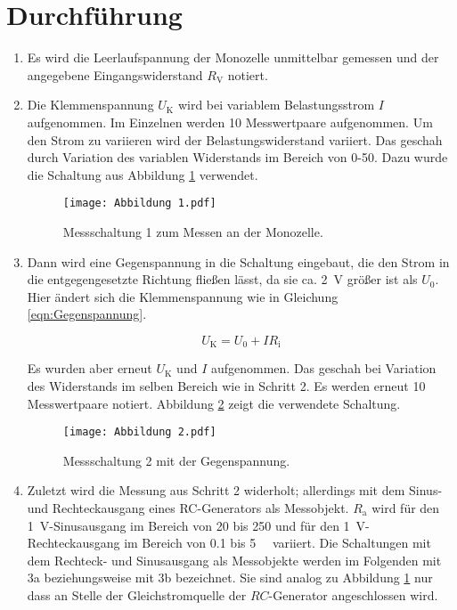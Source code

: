 \section{Durchführung}
\label{sec:Durchführung}

\begin{enumerate}
  \item  Es wird die Leerlaufspannung der Monozelle unmittelbar gemessen und
  der angegebene Eingangswiderstand $R_\text{V}$ notiert.

  \item  Die Klemmenspannung $U_\text{K}$ wird bei variablem Belastungsstrom $I$
  aufgenommen. Im Einzelnen werden 10 Messwertpaare aufgenommen.
  Um den Strom zu variieren wird  der Belastungswiderstand variiert.
  Das geschah durch Variation des variablen Widerstands im Bereich von 0-\SI{50}{\Omega}.
  Dazu wurde die Schaltung aus Abbildung \ref{fig:Schaltung1} verwendet.

\begin{figure}[h]
  \centering
  \texttt{[image: Abbildung 1.pdf]}
  \caption{Messschaltung 1 zum Messen an der Monozelle.\cite{anleitung}}
  \label{fig:Schaltung1}
\end{figure}

  \item Dann wird eine Gegenspannung in die Schaltung eingebaut, die den Strom
  in die entgegengesetzte Richtung fließen lässt, da sie ca. \SI{2}{\volt} größer
  ist als $U_{\text{0}}$. Hier ändert sich die Klemmenspannung
  wie in Gleichung \eqref{eqn:Gegenspannung}.

\begin{equation}
  U_\text{K} = U_\text{0} + IR_\text{i}
  \label{eqn:Gegenspannung}
\end{equation}

  Es wurden aber erneut $U_\text{K}$ und $I$ aufgenommen. Das geschah bei
  Variation des Widerstands im selben Bereich wie in Schritt 2. Es werden
  erneut 10 Messwertpaare notiert. Abbildung \ref{fig:Schaltung2}
  zeigt die verwendete Schaltung.

\begin{figure}[h]
  \centering
  \texttt{[image: Abbildung 2.pdf]}
  \caption{Messschaltung 2 mit der Gegenspannung.\cite{anleitung}}
  \label{fig:Schaltung2}
\end{figure}

  \item Zuletzt wird die Messung aus Schritt 2 widerholt; allerdings mit dem Sinus-
  und Rechteckausgang eines RC-Generators als Messobjekt. $R_\text{a}$ wird für
  den \SI{1}{\volt}-Sinusausgang im Bereich von 20 bis \SI{250}{\Omega} und für den
  \SI{1}{\volt}-Rechteckausgang im Bereich von 0.1 bis \SI{5}{\kilo\Omega} variiert.
  Die Schaltungen mit dem Rechteck- und Sinusausgang als Messobjekte werden im
  Folgenden mit 3a beziehungsweise mit 3b bezeichnet. Sie sind analog zu Abbildung
  \ref{fig:Schaltung1} nur dass an Stelle der Gleichstromquelle der $RC$-Generator
  angeschlossen wird.
\end{enumerate}
